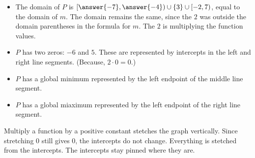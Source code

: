 \documentclass{ximera}
\begin{document}
\begin{example}
\begin{image}
\end{image}




\begin{itemize}

\item The domain of $P$ is $\left[\answer{-7},\answer{-4}\right) \cup \{3\} \cup [-2,7)$, equal to the domain of $m$. The domain remains the same, since the $2$ was outside the domain parentheses in the formula for $m$. The $2$ is multiplying the function values.
\item $P$ has two zeros: $-6$ and $5$. These are represented by intercepts in the left and right line segments. (Because, $2 \cdot 0 = 0$.) \\
\item $P$ has a global minimum represented by the left endpoint of the middle line segment. \\
\item $P$ has a global miaximum represented by the left endpoint of the right line segment.

\end{itemize}


\end{example}


Multiply a function by a positive constant stetches the graph vertically.  Since stretching $0$ still gives $0$, the intercepts do not change.  Everything is stetched from the intercepts. The intercepts stay pinned where they are.
\end{document}

